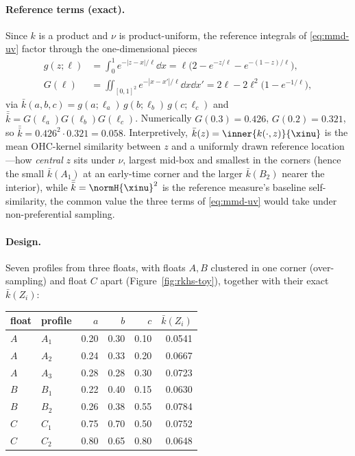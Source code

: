 \paragraph{Reference terms (exact).}
Since $k$ is a product and $\nu$ is product-uniform, the reference integrals of
\eqref{eq:mmd-uv} factor through the one-dimensional pieces
\begin{align*}
  g(z;\ell)&=\int_0^1 e^{-|z-x|/\ell}\dd x=\ell\big(2-e^{-z/\ell}-e^{-(1-z)/\ell}\big),\\
  G(\ell)&=\iint_{[0,1]^2} e^{-|x-x'|/\ell}\dd x\dd x'=2\ell-2\ell^2\big(1-e^{-1/\ell}\big),
\end{align*}
via $\bar k(a,b,c)=g(a;\ell_a)\,g(b;\ell_b)\,g(c;\ell_c)$ and
$\bar{\bar k}=G(\ell_a)G(\ell_b)G(\ell_c)$. Numerically $G(0.3)=0.426$,
$G(0.2)=0.321$, so $\bar{\bar k}=0.426^2\cdot0.321=0.058$. Interpretively,
$\bar k(z)=\inner{k(\cdot,z)}{\xinu}$ is the mean OHC-kernel similarity between
$z$ and a uniformly drawn reference location---how \emph{central} $z$ sits under
$\nu$, largest mid-box and smallest in the corners (hence the small $\bar k(A_1)$
at an early-time corner and the larger $\bar k(B_2)$ nearer the interior), while
$\bar{\bar k}=\normH{\xinu}^2$ is the reference measure's baseline
self-similarity, the common value the three terms of \eqref{eq:mmd-uv} would take
under non-preferential sampling.

\paragraph{Design.}
Seven profiles from three floats, with floats $A,B$ clustered in one corner
(over-sampling) and float $C$ apart (Figure~\ref{fig:rkhs-toy}), together with
their exact $\bar k(Z_i)$:

\begin{center}
\begin{tabular}{llrrrr}
\hline
float & profile & $a$ & $b$ & $c$ & $\bar k(Z_i)$\\
\hline
$A$ & $A_1$ & 0.20 & 0.30 & 0.10 & 0.0541\\
$A$ & $A_2$ & 0.24 & 0.33 & 0.20 & 0.0667\\
$A$ & $A_3$ & 0.28 & 0.28 & 0.30 & 0.0723\\
$B$ & $B_1$ & 0.22 & 0.40 & 0.15 & 0.0630\\
$B$ & $B_2$ & 0.26 & 0.38 & 0.55 & 0.0784\\
$C$ & $C_1$ & 0.75 & 0.70 & 0.50 & 0.0752\\
$C$ & $C_2$ & 0.80 & 0.65 & 0.80 & 0.0648\\
\hline
\end{tabular}
\end{center}

